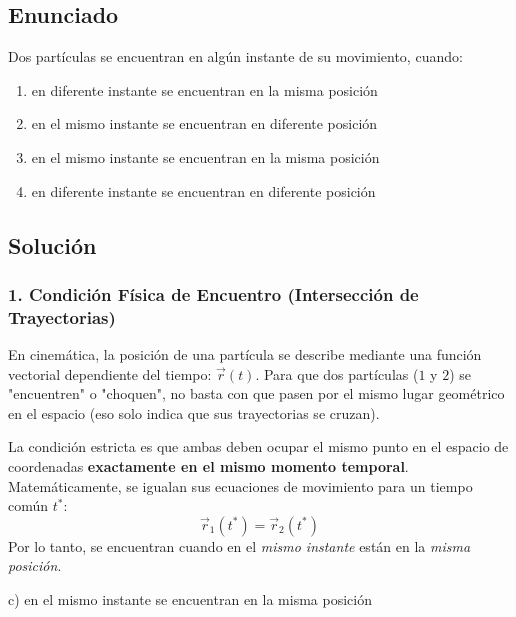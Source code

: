 \documentclass[12pt, a4paper]{article}
\begin{document}
\newpage


\subsection*{Enunciado}
Dos partículas se encuentran en algún instante de su movimiento, cuando:
\begin{enumerate}[label=\alph*)]
    \item en diferente instante se encuentran en la misma posición
    \item en el mismo instante se encuentran en diferente posición
    \item en el mismo instante se encuentran en la misma posición
    \item en diferente instante se encuentran en diferente posición
\end{enumerate}

\subsection*{Solución}

\subsubsection*{1. Condición Física de Encuentro (Intersección de Trayectorias)}
En cinemática, la posición de una partícula se describe mediante una función vectorial dependiente del tiempo: $\vec{r}(t)$.
Para que dos partículas ($1$ y $2$) se "encuentren" o "choquen", no basta con que pasen por el mismo lugar geométrico en el espacio (eso solo indica que sus trayectorias se cruzan). 

La condición estricta es que ambas deben ocupar el mismo punto en el espacio de coordenadas \textbf{exactamente en el mismo momento temporal}. Matemáticamente, se igualan sus ecuaciones de movimiento para un tiempo común $t^*$:
$$ \vec{r}_1(t^*) = \vec{r}_2(t^*) $$
Por lo tanto, se encuentran cuando en el \textit{mismo instante} están en la \textit{misma posición}.

\begin{tcolorbox}[colback=green!5!white, colframe=green!50!black, title=Respuesta Final]
\centering \Large c) en el mismo instante se encuentran en la misma posición
\end{tcolorbox}

\newpage
\end{document}
